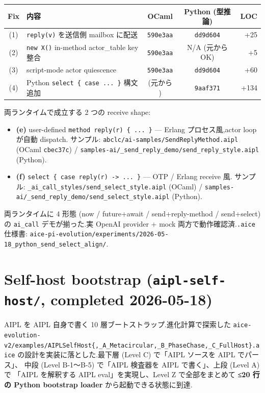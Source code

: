 \documentclass[10pt,a4paper,landscape]{article}
\newcommand{\Yes}{\textcolor{green!50!black}{\textbf{\checkmark}}}
\begin{document}
\begin{center}
\begin{tabular}{clccr}
\toprule
Fix & 内容 & OCaml & Python (型推論) & LOC \\
\midrule
(1) & \texttt{reply(v)} を送信側 mailbox に配送 & \Yes \texttt{590e3aa} & \Yes \texttt{dd9d604} & +25 \\
(2) & \texttt{new X()} in-method actor\_table key 整合 & \Yes \texttt{590e3aa} & N/A (元から OK) & +5 \\
(3) & script-mode actor quiescence & \Yes \texttt{590e3aa} & \Yes \texttt{dd9d604} & +60 \\
(4) & Python \texttt{select \{ case ... \}} 構文追加 & (元から \Yes) & \Yes \texttt{9aaf371} & +134 \\
\bottomrule
\end{tabular}
\end{center}

両ランタイムで成立する 2 つの receive shape:

\begin{itemize}
\item \textbf{(e)} user-defined \texttt{method reply(r) \{ ... \}} —
  Erlang プロセス風,actor loop が自動 dispatch.
  サンプル: \texttt{abclc/ai-samples/SendReplyMethod.aipl} (OCaml \texttt{cbec37c}) /
  \texttt{samples-ai/\_send\_reply\_demo/send\_reply\_style.aipl} (Python).
\item \textbf{(f)} \texttt{select \{ case reply(r) -> ... \}} —
  OTP / Erlang receive 風.
  サンプル: \texttt{\_ai\_call\_styles/send\_select\_style.aipl} (OCaml) /
  \texttt{samples-ai/\_send\_reply\_demo/send\_select\_style.aipl} (Python).
\end{itemize}

\noindent 両ランタイムに 4 形態 (now / future+await / send+reply-method
/ send+select) の \texttt{ai\_call} デモが揃った.実 OpenAI provider +
mock 両方で動作確認済.\texttt{.aice} 仕様書:
\texttt{aice-pi-evolution/experiments/2026-05-18\_python\_send\_select\_align/}.

\clearpage

\section*{Self-host bootstrap (\texttt{aipl-self-host/}, completed 2026-05-18)}

AIPL を AIPL 自身で書く 10 層ブートストラップ.進化計算で探索した
\texttt{aice-evolution-v2/examples/AIPLSelfHost\{,\_A\_Metacircular,\_B\_PhaseChase,\_C\_FullHost\}.aice}
の設計を実装に落とした.最下層 (Level C) で「AIPL ソースを AIPL でパース」、
中段 (Level B-1〜B-5) で「AIPL 検査器を AIPL で書く」、上段 (Level A) で
「AIPL を解釈する AIPL eval」を実現し、Level Z で全部をまとめて
\textbf{≤20 行の Python bootstrap loader} から起動できる状態に到達.
\end{document}
